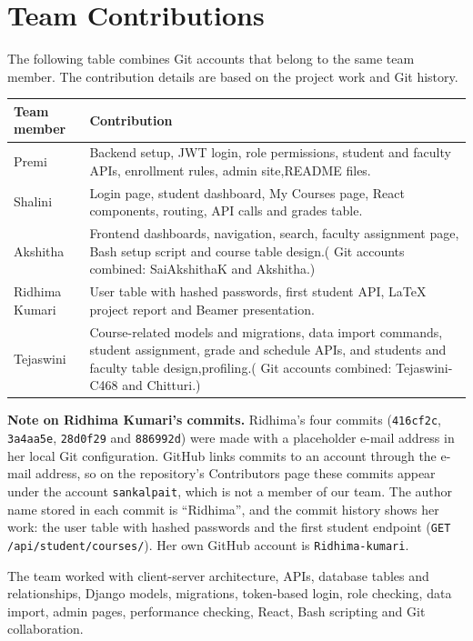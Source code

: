\documentclass[11pt,a4paper]{article}
\begin{document}
\section{Team Contributions}

The following table combines Git accounts that belong to the same team member.
The contribution details are based on the project work and Git history.

\begin{table}[H]
\centering
\begin{tabular}{p{3.0cm}p{10.5cm}}
\toprule
\textbf{Team member} & \textbf{Contribution} \\
\midrule
Premi & Backend setup, JWT login, role permissions, student and faculty
APIs, enrollment rules, admin site,README files. \\
Shalini & Login page, student dashboard, My Courses page, React
components, routing, API calls and grades table. \\
Akshitha & Frontend dashboards, navigation, search, faculty assignment page,
Bash setup script and course table design.( Git accounts combined:
SaiAkshithaK and Akshitha.) \\
Ridhima Kumari & User table with hashed passwords, first student API,
LaTeX project report and Beamer presentation.
  \\
Tejaswini & Course-related models and migrations, data import commands,
student assignment, grade and schedule APIs, and students and faculty table
design,profiling.( Git accounts combined: Tejaswini-C468 and Chitturi.) \\
\bottomrule
\end{tabular}
\end{table}

\textbf{Note on Ridhima Kumari's commits.} Ridhima's four commits
(\texttt{416cf2c}, \texttt{3a4aa5e}, \texttt{28d0f29} and \texttt{886992d})
were made with a placeholder e-mail address in her local Git configuration.
GitHub links commits to an account through the e-mail address, so on the
repository's Contributors page these commits appear under the account
\texttt{sankalpait}, which is not a member of our team. The author name stored
in each commit is ``Ridhima'', and the commit history shows her work: the user
table with hashed passwords and the first student endpoint
(\texttt{GET /api/student/courses/}). Her own GitHub account is
\texttt{Ridhima-kumari}.

The team worked with client-server architecture, APIs, database tables and
relationships, Django models, migrations, token-based login, role checking,
data import, admin pages, performance checking, React, Bash scripting and
Git collaboration.
\end{document}
